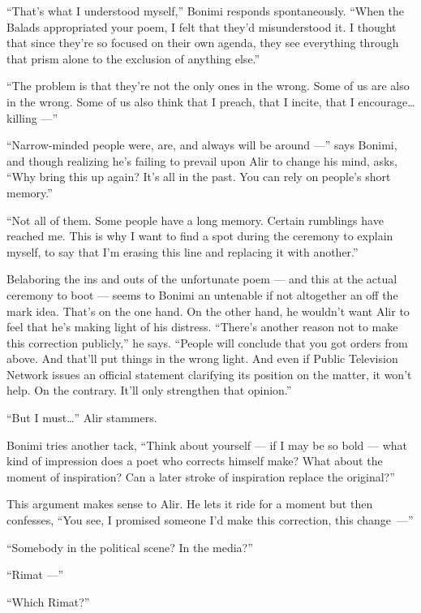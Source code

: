 \documentclass[twoside,11pt,openany]{book}
\begin{document}
``That's what I understood myself,'' Bonimi responds spontaneously.
``When the
Balads appropriated your poem, I felt that they'd misunderstood it. I thought that since they're so focused on their
own agenda, they see everything through that prism alone to the exclusion of anything else.''

``The problem is that they're not the only ones in the wrong. Some of us are also in the wrong. Some of us
also think that I preach, that I incite, that I encourage{\ldots}killing ---''

``Narrow-minded people were, are, and always will be around ---''
says Bonimi, and though
realizing he's failing to prevail upon Alir to change his mind, asks, ``Why bring this up again? It's all
in the past. You can rely on people's short memory.''

``Not all of them. Some people have a long memory. Certain rumblings have reached me. This is why I want to
find a spot during the ceremony to explain myself, to say that I'm erasing this line and replacing it with
another.''

Belaboring the ins and outs of the unfortunate poem ---  and this at the actual ceremony to boot --- seems to Bonimi an
untenable if not altogether an off the mark idea. That's on the one hand. On the other hand, he wouldn't want Alir to
feel that he's making light of his distress. ``There's another reason not to make this correction
publicly,'' he says. ``People will conclude that you got orders from above. And that'll put things in the wrong
light. And even if Public Television Network issues an official statement clarifying its position on the matter, it
won't help. On the contrary. It'll only strengthen that opinion.''

``But I must{\ldots}'' Alir stammers.

Bonimi tries another tack, ``Think about yourself --- if I may be so bold --- what kind of impression does a
poet who corrects himself make? What about the moment of inspiration? Can a later stroke of inspiration replace the
original?''

This argument makes sense to Alir. He lets it ride for a moment but then confesses, ``You see, I promised
someone I'd make this correction, this change~---''

``Somebody in the political scene? In the media?''

``Rimat ---''

``Which Rimat?''
\end{document}
